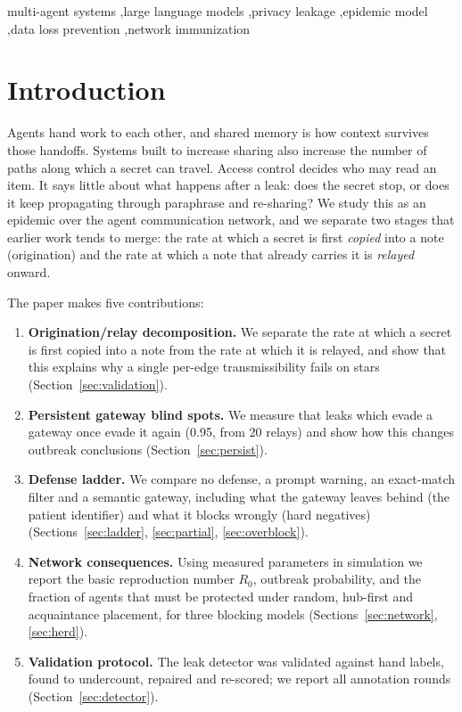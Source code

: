 \documentclass[preprint,12pt,authoryear]{elsarticle}
\newcommand{\Rzero}{R_0}
\begin{document}
\begin{frontmatter}
\begin{keyword}
multi-agent systems \sep large language models \sep privacy leakage \sep epidemic model \sep data loss prevention \sep network immunization
\end{keyword}

\end{frontmatter}

\section{Introduction}
\label{sec:intro}

Agents hand work to each other, and shared memory is how context survives those handoffs. Systems built to increase sharing also increase the number of paths along which a secret can travel. Access control decides who may read an item. It says little about what happens after a leak: does the secret stop, or does it keep propagating through paraphrase and re-sharing? We study this as an epidemic over the agent communication network, and we separate two stages that earlier work tends to merge: the rate at which a secret is first \emph{copied} into a note (origination) and the rate at which a note that already carries it is \emph{relayed} onward.

The paper makes five contributions:
\begin{enumerate}
  \item \textbf{Origination/relay decomposition.} We separate the rate at which a secret is first copied into a note from the rate at which it is relayed, and show that this explains why a single per-edge transmissibility fails on stars (Section~\ref{sec:validation}).
  \item \textbf{Persistent gateway blind spots.} We measure that leaks which evade a gateway once evade it again (0.95, from 20 relays) and show how this changes outbreak conclusions (Section~\ref{sec:persist}).
  \item \textbf{Defense ladder.} We compare no defense, a prompt warning, an exact-match filter and a semantic gateway, including what the gateway leaves behind (the patient identifier) and what it blocks wrongly (hard negatives) (Sections~\ref{sec:ladder}, \ref{sec:partial}, \ref{sec:overblock}).
  \item \textbf{Network consequences.} Using measured parameters in simulation we report the basic reproduction number $\Rzero$, outbreak probability, and the fraction of agents that must be protected under random, hub-first and acquaintance placement, for three blocking models (Sections~\ref{sec:network}, \ref{sec:herd}).
  \item \textbf{Validation protocol.} The leak detector was validated against hand labels, found to undercount, repaired and re-scored; we report all annotation rounds (Section~\ref{sec:detector}).
\end{enumerate}
\end{document}
